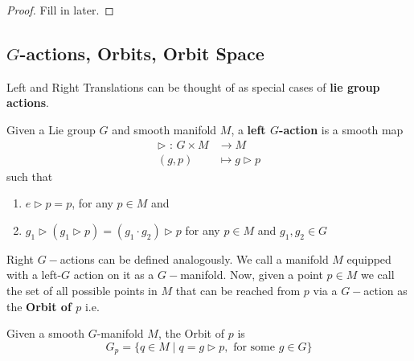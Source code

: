 \documentclass[11pt]{article}
\begin{document}
\begin{proof}
    Fill in later.
\end{proof}

\vskip 0.5cm
\subsection{$G$-actions, Orbits, Orbit Space}

Left and Right Translations can be thought of as special cases of \textbf{lie group actions}.

\begin{definition}
    Given a Lie group $G$ and smooth manifold $M$, a \textbf{left $G$-action} is a smooth map 
    \begin{align*}
        \triangleright \text{ : } G \times M &\rightarrow M \\
        (g, p) &\mapsto g \triangleright p
    \end{align*} such that 
    \begin{enumerate}
        \item $e \triangleright p = p$, for any $p \in M$ and 
        \item $g_1 \triangleright \left( g_1 \triangleright p \right) = (g_1 \cdot g_2) \triangleright p$ for any $p \in M$ and $g_1, g_2 \in G$
    \end{enumerate}
\end{definition}

Right $G-$actions can be defined analogously. We call a manifold $M$ equipped with a left-$G$ action on it as a $G-$manifold. Now, given a point $p \in M$ we call the set of all possible points in $M$ that can be reached from $p$ via a $G-$action as the \textbf{Orbit of $p$} i.e.

\begin{definition}
    Given a smooth $G$-manifold $M$, the Orbit of $p$ is \[ G_p = \{ q \in M \;|\; q = g \triangleright p, \text{ for some } g \in G \} \]
\end{definition}
\end{document}
